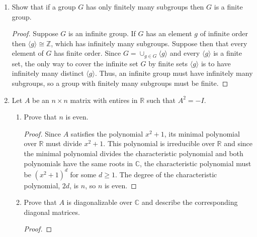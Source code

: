 \documentclass[11pt,letterpaper]{report}
\newcommand{\integers}{\mathbb{Z}}
\newcommand{\complex}{\mathbb{C}}
\newcommand{\reals}{\mathbb{R}}
\newcommand{\rationals}{\mathbb{Q}}
\newenvironment{solution}
{\begin{proof}[Solution]}
{\end{proof}}
\begin{document}
\begin{enumerate}
\begin{enumerate}
\begin{solution}
			\noindent The ideal $P_2 = (x^2)$ is not prime since $x\cdot x$ is in $P_2$ but $x$ is not. Since maximal ideals are always prime, this shows that $P_2$ isn't maximal either.\\

			\noindent The ideal $P_3 = (x)$ is prime but not maximal since $R/P_3 = \rationals[y]$, which is an integral domain but not a field.
		\end{solution}
	\end{enumerate}

	\item Show that if a group $G$ has only finitely many subgroups then $G$ is a finite group.
	\begin{proof}
		Suppose $G$ is an infinite group. If $G$ has an element $g$ of infinite order then $\langle g\rangle\cong \integers$, which has infinitely many subgroups. Suppose then that every element of $G$ has finite order. Since $G = \cup_{g\in G}\langle g\rangle$ and every $\langle g\rangle$ is a finite set, the only way to cover the infinite set $G$ by finite sets $\langle g\rangle$ is to have infinitely many distinct $\langle g\rangle$. Thus, an infinite group must have infinitely many subgroups, so a group with finitely many subgroups must be finite.
	\end{proof}

	\item Let $A$ be an $n\times n$ matrix with entires in $\reals$ such that $A^2 = -I$.
	\begin{enumerate}
		\item Prove that $n$ is even.
		\begin{proof}
			Since $A$ satisfies the polynomial $x^2+1$, its minimal polynomial over $\mathbb{R}$ must divide $x^2+1$. This polynomial is irreducible over $\mathbb{R}$ and since the minimal polynomial divides the characteristic polynomial and both polynomials have the same roots in $\complex$, the characteristic polynomial must be $(x^2+1)^d$ for some $d\geq 1$. The degree of the characteristic polynomial, $2d$, is $n$, so $n$ is even.
		\end{proof}
		\item Prove that $A$ is diagonalizable over $\complex$ and describe the corresponding diagonal matrices.
		\begin{proof}
			
		\end{proof}
	\end{enumerate}
\end{enumerate}
\end{document}
